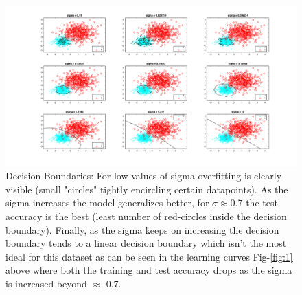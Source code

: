 \documentclass[a4paper,11pt]{article}
\begin{document}
\begin{figure}[ht!]
    \centering
    \includegraphics[scale=0.4]{sigma_figs.png}
    \caption{Decision Boundaries: For low values of sigma overfitting is clearly visible (small "circles" tightly encircling certain datapoints). As the sigma increases the model generalizes better, for $\sigma \approx 0.7$ the test accuracy is the best (least number of red-circles inside the decision boundary). Finally, as the sigma keeps on increasing the decision boundary tends to a linear decision boundary which isn't the most ideal for this dataset as can be seen in the learning curves Fig-\ref{fig:1} above where both the training and test accuracy drops as the sigma is increased beyond $\approx$ 0.7.}
    \label{fig:2}
\end{figure}
\end{document}
